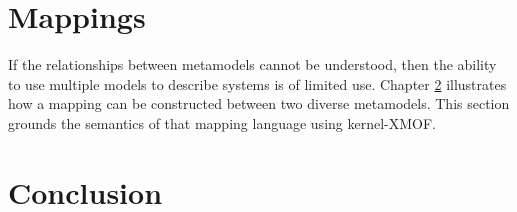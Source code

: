 \section{Mappings}

If the relationships between metamodels cannot be understood, then the ability to use multiple models to describe systems is of limited use.  Chapter \ref{} illustrates how a mapping can be constructed between two diverse metamodels.  This section grounds the semantics of that mapping language using kernel-XMOF.

\section{Conclusion}
